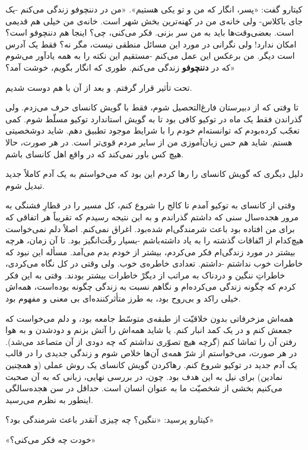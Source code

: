 \documentclass[a5paper]{book}
\begin{document}
کیتارو گفت: «پسر، انگار که من و تو یکی هستیم». «من در دننچوفو زندگی می‌کنم -یک جای باکلاس- ولی خانه‌ی من در کهنه‌ترین بخش شهر است. خانه‌ی من خیلی هم قدیمی است. بعضی‌وقت‌ها باید به من سر بزنی. فکر می‌کنی، چی؟ اینجا هم دننچوفو است؟ امکان ندارد! ولی نگرانی در مورد این مسائل منطقی نیست، مگر نه؟ فقط یک آدرس است دیگر. من برعکس این عمل می‌کنم -مستقیم این نکته را به همه یادآور می‌شوم که در \textbf{دننچوفو} زندگی می‌کنم. طوری که انگار بگویم، خوشت آمد؟»

تحت تأثیر قرار گرفتم. و بعد از آن با هم دوست شدیم.

تا وقتی که از دبیرستان فارغ‌التحصیل شوم، فقط با گویش کانسای حرف می‌زدم. ولی گذراندن فقط یک ماه در توکیو کافی‌ بود تا به گویش استاندارد توکیو مسلّط شوم. کمی تعجّب کرده‌بودم که توانسته‌ام خودم را با شرایط موجود تطبیق دهم. شاید دوشخصیتی هستم. شاید هم حس زبان‌آموزی من از سایر مردم قوی‌تر است. در هر صورت، حالا هیچ کس باور نمی‌کند که در واقع اهل کانسای باشم.

دلیل دیگری که گویش کانسای را رها کردم این بود که می‌خواستم به یک آدم کاملاً جدید تبدیل شوم.

وقتی از کانسای به توکیو آمدم تا کالج را شروع کنم، کل مسیر را در قطارِ فشنگی به مرور هجده‌سال سنی که داشتم گذراندم و به این نتیجه رسیدم که تقریباً هر اتفاقی که برای من افتاده بود باعث شرمندگی‌ام شده‌بود. اغراق نمی‌کنم. اصلاً دلم نمی‌خواست هیچ‌کدام از اتّفاقات گذشته را به یاد داشته‌باشم -بسیار رقّت‌انگیز بود. تا آن زمان، هرچه بیشتر در مورد زندگی‌ام فکر می‌کردم، بیشتر از خودم بدم می‌آمد. مسأله این نبود که خاطرات خوب نداشتم -داشتم. تعدادی خاطره‌ی خوب. ولی وقتی در کل نگاه می‌کردی، خاطراتِ ننگین و دردناک به مراتب از دیگرْ خاطرات بیشتر بودند. وقتی به این فکر کردم که چگونه زندگی می‌کرده‌ام و نگاهم نسبت به زندگی چگونه بوده‌است، همه‌اش خیلی راکد و بی‌روح بود، به طرز متأثرکننده‌ای بی معنی و مفهوم بود.

همه‌اش مزخرفاتی بدون خلاقیّت از طبقه‌ی متوسّط جامعه بود، و دلم می‌خواست که جمعش کنم و در یک کمد انبار کنم. یا شاید همه‌اش را آتش بزنم و دودشدن و به هوا رفتن آن را تماشا کنم (گرچه هیچ تصوّری نداشتم که چه دودی از آن متصاعد می‌شد). در هر صورت، می‌خواستم از شرّ همه‌ی آن‌ها خلاص شوم و زندگی جدیدی را در قالب یک آدم جدید در توکیو شروع کنم. رهاکردن گویش کانسای یک روش عملی (و همچنین نمادین) برای نیل به این هدف بود. چون، در بررسی نهایی، زبانی که به آن صحبت می‌کنیم بخشی از شخصیّت ما به عنوان انسان است. حداقل در سن هجده‌سالگی اینطور به نظرم می‌رسید.

کیتارو پرسید: «ننگین؟ چه چیزی آنقدر باعث شرمندگی بود؟»

«خودت چه فکر می‌کنی؟»
\end{document}
